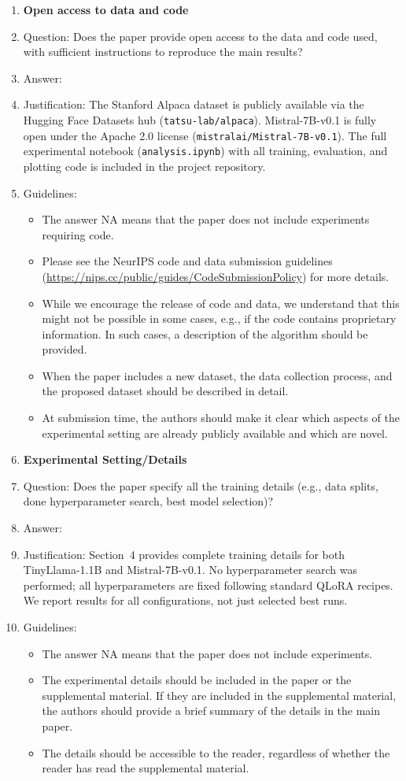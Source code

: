 \documentclass{article}
\begin{document}
\begin{enumerate}
\item {\bf Open access to data and code}
\item[] Question: Does the paper provide open access to the data and code used, with sufficient instructions to reproduce the main results?
\item[] Answer: \answerYes{}
\item[] Justification: The Stanford Alpaca dataset is publicly available via the Hugging Face Datasets hub (\texttt{tatsu-lab/alpaca}). Mistral-7B-v0.1 is fully open under the Apache 2.0 license (\texttt{mistralai/Mistral-7B-v0.1}). The full experimental notebook (\texttt{analysis.ipynb}) with all training, evaluation, and plotting code is included in the project repository.
\item[] Guidelines:
\begin{itemize}
    \item The answer NA means that the paper does not include experiments requiring code.
    \item Please see the NeurIPS code and data submission guidelines (\url{https://nips.cc/public/guides/CodeSubmissionPolicy}) for more details.
    \item While we encourage the release of code and data, we understand that this might not be possible in some cases, e.g., if the code contains proprietary information. In such cases, a description of the algorithm should be provided.
    \item When the paper includes a new dataset, the data collection process, and the proposed dataset should be described in detail.
    \item At submission time, the authors should make it clear which aspects of the experimental setting are already publicly available and which are novel.
\end{itemize}

\item {\bf Experimental Setting/Details}
\item[] Question: Does the paper specify all the training details (e.g., data splits, done hyperparameter search, best model selection)?
\item[] Answer: \answerYes{}
\item[] Justification: Section~4 provides complete training details for both TinyLlama-1.1B and Mistral-7B-v0.1. No hyperparameter search was performed; all hyperparameters are fixed following standard QLoRA recipes. We report results for all configurations, not just selected best runs.
\item[] Guidelines:
\begin{itemize}
    \item The answer NA means that the paper does not include experiments.
    \item The experimental details should be included in the paper or the supplemental material. If they are included in the supplemental material, the authors should provide a brief summary of the details in the main paper.
    \item The details should be accessible to the reader, regardless of whether the reader has read the supplemental material.
\end{itemize}


\end{enumerate}
\end{document}
